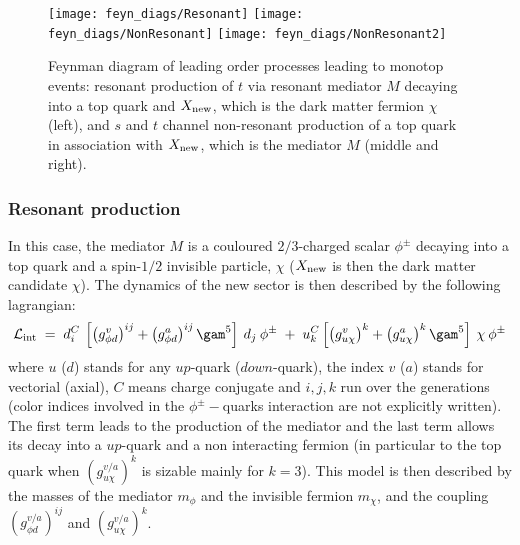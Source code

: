 \begin{figure}[!h!tpd]
\centering
\texttt{[image: feyn\_diags/Resonant]}
\texttt{[image: feyn\_diags/NonResonant]}
\texttt{[image: feyn\_diags/NonResonant2]}
\caption
{
Feynman diagram of leading order processes leading to monotop events: resonant production of
$t$ via resonant mediator $M$ decaying into a top quark and $X_{\mathrm{new}}$, which is the dark matter fermion $\chi$ (left),
and $s$ and $t$ channel non-resonant production of a top quark in association with $X_{\mathrm{new}}$, which is the mediator $M$ (middle and right).
}
\label{fig:feyn_prod}

\end{figure}


\subsubsection{Resonant production}
\label{sec:ResonantProd}

In this case, the mediator $M$ is a couloured $2/3$-charged scalar $\phi^{\pm}$ decaying into a top quark and a spin-$1/2$ invisible particle, $\chi$ 
($X_{\mathrm{new}}$ is then the dark matter candidate $\chi$). The dynamics of the new sector is then described by the following lagrangian:
\begin{equation}
 \label{eq:lagrangianResonant}
 \Lagr_{\mathrm{int}} \; = \; d^{C}_{i} \:  \left[ \left(g^{v}_{\phi d}\right)^{ij} +  \left(g^{a}_{\phi d}\right)^{ij} \gam^{5} \right] \: d_{j} \: \phi^{\pm} \; 
 + \; u^{C}_{k}  \left[ \left(g^{v}_{u\chi}\right)^{k} + \left(g^{a}_{u\chi}\right)^{k} \gam^{5} \right] \: \chi \: \phi^{\pm}
\end{equation}
where $u$ ($d$) stands for any $up$-quark ($down$-quark), the index $v$ ($a$) stands for vectorial (axial), $C$ means charge conjugate and $i,j,k$ run over the generations (color 
indices involved in the $\phi^{\pm}-$quarks interaction are not explicitly written).
The first term leads to the production of the mediator and the last term allows its decay into a $up$-quark 
and a non interacting fermion (in particular to the top quark when $\left(g^{v/a}_{u\chi}\right)^{k}$ is sizable mainly for $k=3$).
This model is then described by the masses of the mediator $m_{\phi}$ and the invisible fermion $m_{\chi}$, and the coupling 
$\left(g^{v/a}_{\phi d}\right)^{ij}$ and $\left(g^{v/a}_{u\chi}\right)^{k}$.

